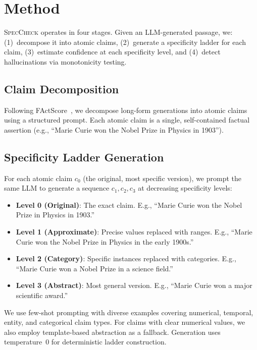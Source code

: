 \documentclass{article}
\newcommand{\speccheck}{\textsc{SpecCheck}}
\begin{document}
\section{Method}
\label{sec:method}

\speccheck{} operates in four stages.
Given an LLM-generated passage, we:
(1)~decompose it into atomic claims,
(2)~generate a specificity ladder for each claim,
(3)~estimate confidence at each specificity level, and
(4)~detect hallucinations via monotonicity testing.

\subsection{Claim Decomposition}

Following FActScore~\citep{min2023factscore}, we decompose long-form generations into atomic claims using a structured prompt.
Each atomic claim is a single, self-contained factual assertion (e.g., ``Marie Curie won the Nobel Prize in Physics in 1903'').

\subsection{Specificity Ladder Generation}

For each atomic claim $c_0$ (the original, most specific version), we prompt the same LLM to generate a sequence $c_1, c_2, c_3$ at decreasing specificity levels:
\begin{itemize}
    \item \textbf{Level 0 (Original)}: The exact claim. E.g., ``Marie Curie won the Nobel Prize in Physics in 1903.''
    \item \textbf{Level 1 (Approximate)}: Precise values replaced with ranges. E.g., ``Marie Curie won the Nobel Prize in Physics in the early 1900s.''
    \item \textbf{Level 2 (Category)}: Specific instances replaced with categories. E.g., ``Marie Curie won a Nobel Prize in a science field.''
    \item \textbf{Level 3 (Abstract)}: Most general version. E.g., ``Marie Curie won a major scientific award.''
\end{itemize}

We use few-shot prompting with diverse examples covering numerical, temporal, entity, and categorical claim types.
For claims with clear numerical values, we also employ template-based abstraction as a fallback.
Generation uses temperature~0 for deterministic ladder construction.
\end{document}
